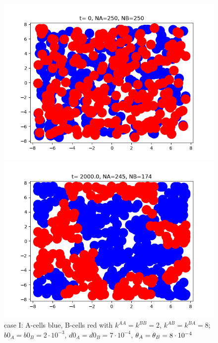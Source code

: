 \begin{figure}[htb]
	\begin{minipage}[t]{.45\textwidth}
		\centering
		\includegraphics[width=\textwidth]{micro_caseI_ini2}
	\end{minipage}
	\hfill
	\begin{minipage}[t]{.45\textwidth}
		\centering
		\includegraphics[width=\textwidth]{micro_caseI_fin2}
	\end{minipage}  
	\caption{{case I: A-cells blue, B-cells red with $k^{AA}=k^{BB}=2 $, $k^{AB}=k^{BA}=8$; $b0_A=b0_B=2\cdot10^{-3}$, $d0_A=d0_B=7\cdot10^{-4}$, ${\theta}_A={\theta}_B=8\cdot 10^{-4}$}	}
\end{figure}


